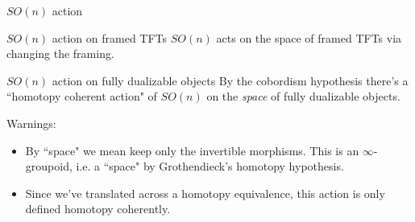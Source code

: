\documentclass[beamer]{beamer}
\begin{document}

\begin{frame}{$SO(n)$ action}
\begin{block}{$SO(n)$ action on framed TFTs}
$SO(n)$ acts on the space of framed TFTs via changing the framing.
\end{block}

\begin{block}{$SO(n)$ action on fully dualizable objects}
By the cobordism hypothesis there's a ``homotopy coherent action" of $SO(n)$ on the \emph{space} of fully dualizable objects.
\end{block}

\begin{block}{Warnings:}
\begin{itemize}
\item By ``space" we mean keep only the invertible morphisms.  This is an $\infty$-groupoid, i.e. a ``space" by Grothendieck's homotopy hypothesis.
\item Since we've translated across a homotopy equivalence, this action is only defined homotopy coherently.
\end{itemize}
\end{block}
\end{frame}
\end{document}
